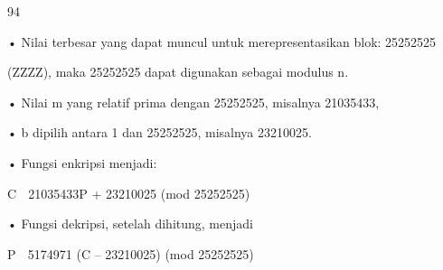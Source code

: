 \documentclass{article}
\begin{document}

94

• Nilai terbesar yang dapat muncul untuk merepresentasikan blok: 25252525 

(ZZZZ),  maka 25252525 dapat digunakan sebagai modulus n. 

• Nilai m yang relatif prima dengan 25252525, misalnya 21035433,

• b dipilih antara 1 dan 25252525, misalnya 23210025. 

• Fungsi enkripsi menjadi:


C  21035433P + 23210025 (mod 25252525)

• Fungsi dekripsi, setelah dihitung, menjadi


P  5174971 (C – 23210025)  (mod 25252525)
\end{document}
